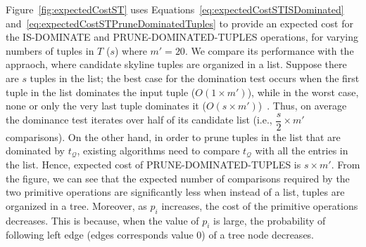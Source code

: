 Figure~\ref{fig:expectedCostST}
uses Equations~\ref{eq:expectedCostSTISDominated} and~\ref{eq:expectedCostSTPruneDominatedTuples} to provide an expected cost for the IS-DOMINATE and PRUNE-DOMINATED-TUPLES operations, for varying numbers of tuples in $T$ ($s$) where $m'=20$.
We compare its performance with the appraoch, where candidate skyline tuples are organized in a list.
Suppose there are $s$ tuples in the list; the best case for the domination test occurs when the first tuple in the list dominates the input tuple ($O(1\times m')$), while in the worst case, none or only the very last tuple dominates it ($O(s\times m')$)~\cite{borzsony2001skyline}. Thus, on average the dominance test iterates over half of its candidate list (i.e., $\dfrac{s}{2}\times m'$ comparisons).
On the other hand, in order to prune tuples in the list that are dominated by $t_\mathcal{Q}$, existing algorithms need to compare $t_\mathcal{Q}$ with all the entries in the list. Hence, expected cost of PRUNE-DOMINATED-TUPLES is $s \times m'$. From the figure, we can see that the expected number of comparisons required by the two primitive operations are significantly less when instead of a list, tuples are organized in a tree. Moreover, as $p_i$ increases, the cost of the primitive operations decreases. This is because, when the value of $p_i$ is large, the probability of following left edge (edges corresponds value $0$) of a tree node decreases. 



